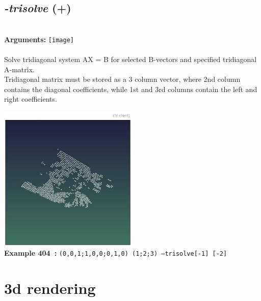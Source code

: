 \documentclass[a4paper,11pt,twoside]{book}
\begin{document}
\subsection{\emph{-trisolve} (+)}\vspace*{-0.5em}
~\\\textbf{Arguments: } 
{\small \texttt{[image]}}\\~\\
Solve tridiagonal system AX = B for selected B-vectors and specified tridiagonal A-matrix.
~\\Tridiagonal matrix must be stored as a 3 column vector, where 2nd column contains the
diagonal coefficients, while 1st and 3rd columns contain the left and right coefficients.
\begin{center}\includegraphics[keepaspectratio=true,height=7cm,width=\textwidth]{img/gmic_def404.jpg}\\
{\footnotesize \textbf{Example 404~:} \texttt{(0,0,1;1,0,0;0,1,0) (1;2;3) --trisolve[-1] [-2]}}
\end{center}
\section{3d rendering}
\end{document}

